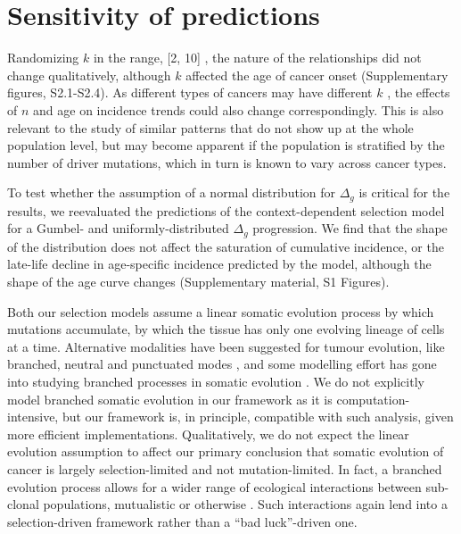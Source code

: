 \documentclass[12pt,onecolumn,twoside]{article}
\begin{document}
\section{Sensitivity of predictions}

Randomizing $k$ in the range, [2, 10] \autocite{Martincorena2017}, the nature of the relationships did not change qualitatively, although $k$ affected the age of cancer onset (Supplementary figures, S2.1-S2.4). As different types of cancers may have different $k$ \autocite{Nunney2015}, the effects of $n$ and age on incidence trends could also change correspondingly. This is also relevant to the study of similar patterns that do not show up at the whole population level, but may become apparent if the population is stratified by the number of driver mutations, which in turn is known to vary across cancer types.

To test whether the assumption of a normal distribution for $\Delta_{g}$ is critical for the results, we reevaluated the predictions of the context-dependent selection model for a Gumbel- and uniformly-distributed $\Delta_{g}$ progression. We find that the shape of the distribution does not affect the saturation of cumulative incidence, or the late-life decline in age-specific incidence predicted by the model, although the shape of the age curve changes (Supplementary material, S1 Figures).

Both our selection models assume a linear somatic evolution process by which mutations accumulate, by which the tissue has only one evolving lineage of cells at a time. Alternative modalities have been suggested for tumour evolution, like branched, neutral and punctuated modes \autocite{Davis2017a}, and some modelling effort has gone into studying branched processes in somatic evolution \autocite{Chowell2018}. We do not explicitly model branched somatic evolution in our framework as it is computation-intensive, but our framework is, in principle, compatible with such analysis, given more efficient implementations. Qualitatively, we do not expect the linear evolution assumption to affect our primary conclusion that somatic evolution of cancer is largely selection-limited and not mutation-limited. In fact, a branched evolution process allows for a wider range of ecological interactions between sub-clonal populations, mutualistic or otherwise \autocite{}. Such interactions again lend into a selection-driven framework rather than a ``bad luck''-driven one.
\end{document}
